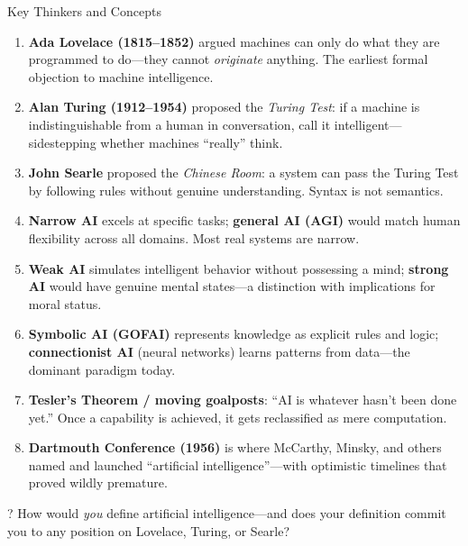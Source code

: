 \documentclass[aspectratio=169,11pt]{beamer}
\begin{document}
\begin{frame}{Key Thinkers and Concepts}
{\footnotesize
\begin{enumerate}
    \item \textbf{Ada Lovelace (1815--1852)} argued machines can only do what they are programmed to do---they cannot \textit{originate} anything. The earliest formal objection to machine intelligence.
    \item \textbf{Alan Turing (1912--1954)} proposed the \textit{Turing Test}: if a machine is indistinguishable from a human in conversation, call it intelligent---sidestepping whether machines ``really'' think.
    \item \textbf{John Searle} proposed the \textit{Chinese Room}: a system can pass the Turing Test by following rules without genuine understanding. Syntax is not semantics.
    \item \textbf{Narrow AI} excels at specific tasks; \textbf{general AI (AGI)} would match human flexibility across all domains. Most real systems are narrow.
    \item \textbf{Weak AI} simulates intelligent behavior without possessing a mind; \textbf{strong AI} would have genuine mental states---a distinction with implications for moral status.
    \item \textbf{Symbolic AI (GOFAI)} represents knowledge as explicit rules and logic; \textbf{connectionist AI} (neural networks) learns patterns from data---the dominant paradigm today.
    \item \textbf{Tesler's Theorem / moving goalposts}: ``AI is whatever hasn't been done yet.'' Once a capability is achieved, it gets reclassified as mere computation.
    \item \textbf{Dartmouth Conference (1956)} is where McCarthy, Minsky, and others named and launched ``artificial intelligence''---with optimistic timelines that proved wildly premature.
\end{enumerate}
}

\begin{alertblock}{?}
How would \emph{you} define artificial intelligence---and does your definition commit you to any position on Lovelace, Turing, or Searle?
\end{alertblock}
\end{frame}
\end{document}
